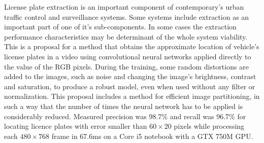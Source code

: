 
License plate extraction is an important component of contemporary's urban
traffic control and surveillance systems. 
Some systems include extraction as an important part of one of it's
sub-components.
In some cases the extraction performance characteristics may be determinant
of the whole system viability.
This is a proposal for a method that obtains the approximate location of
vehicle's license plates
in a video using convolutional neural networks applied directly to
the value of the RGB pixels. During the training, some random distortions are
added to the images, such as noise and changing the image's brightness,
contrast and saturation, to produce a robust model, even when used without any
filter or normalization. This proposal includes a method for efficient image
partitioning, in such a way that the number of times the neural network has to
be applied is considerably reduced. Measured precision was 98.7\% and
recall was 96.7\% for locating licence plates with error smaller than
$60 \times 20$ pixels while processing each $480 \times 768$ frame in 67.6ms on
a Core i5 notebook with a GTX 750M GPU.
